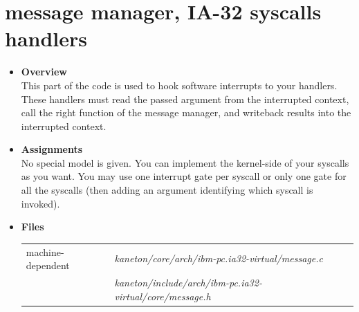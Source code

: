 \section{message manager, \textbf{IA-32 syscalls handlers}}
\begin{itemize}
  \item {\bf Overview}\\

    This part of the code is used to hook software interrupts to your
    handlers. These handlers must read the passed argument from the
    interrupted context, call the right function of the message
    manager, and writeback results into the interrupted context.

  \item {\bf Assignments}\\

    No special model is given. You can implement the kernel-side of
    your syscalls as you want. You may use one interrupt gate per
    syscall or only one gate for all the syscalls (then adding an
    argument identifying which syscall is invoked).

  \item {\bf {Files}}\\

    \begin{tabular}{| l | l |}
      \hline
      machine-dependent & {\em kaneton/core/arch/ibm-pc.ia32-virtual/message.c}\\
      & {\em kaneton/include/arch/ibm-pc.ia32-virtual/core/message.h}\\\hline
    \end{tabular}

\end{itemize}

\newpage

